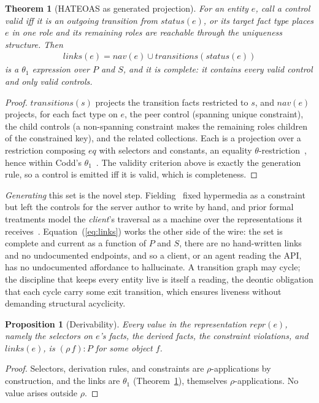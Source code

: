 \documentclass[10pt,twocolumn]{article}
\theoremstyle{plain}
\newtheorem{theorem}{Theorem}
\newtheorem{proposition}{Proposition}
\theoremstyle{definition}
\begin{document}
\begin{theorem}[HATEOAS as generated projection]\label{thm:hateoas}
For an entity $e$, call a control \emph{valid} iff it is an outgoing transition from $\mathit{status}(e)$, or its target fact type places $e$ in one role and its remaining roles are reachable through the uniqueness structure. Then
\begin{align}
\mathit{links}(e)=\mathit{nav}(e)\cup\mathit{transitions}(\mathit{status}(e)) \label{eq:links}
\end{align}
is a $\theta_1$ expression over $P$ and $S$, and it is \emph{complete}: it contains every valid control and only valid controls.
\end{theorem}
\begin{proof}
$\mathit{transitions}(s)$ projects the transition facts restricted to $s$, and $\mathit{nav}(e)$ projects, for each fact type on $e$, the peer control (spanning unique constraint), the child controls (a non-spanning constraint makes the remaining roles children of the constrained key), and the related collections. Each is a projection over a restriction composing $\mathit{eq}$ with selectors and constants, an equality $\theta$-restriction~\cite[Sec.\,2.3.5]{codd72}, hence within Codd's $\theta_1$~\cite[Sec.\,2.2]{codd70}. The validity criterion above is exactly the generation rule, so a control is emitted iff it is valid, which is completeness.
\end{proof}

\noindent \emph{Generating} this set is the novel step. Fielding~\cite{fielding00} fixed hypermedia as a constraint but left the controls for the server author to write by hand, and prior formal treatments model the \emph{client}'s traversal as a machine over the representations it receives~\cite{zuzak11}. Equation~(\ref{eq:links}) works the other side of the wire: the set is complete and current as a function of $P$ and $S$, there are no hand-written links and no undocumented endpoints, and so a client, or an agent reading the API, has no undocumented affordance to hallucinate. A transition graph may cycle; the discipline that keeps every entity live is itself a reading, the deontic obligation that each cycle carry some exit transition, which ensures liveness without demanding structural acyclicity.

\begin{proposition}[Derivability]\label{prop:derive}
Every value in the representation $\mathit{repr}(e)$, namely the selectors on $e$'s facts, the derived facts, the constraint violations, and $\mathit{links}(e)$, is $(\rho\,f)\!:\!P$ for some object $f$.
\end{proposition}
\begin{proof}
Selectors, derivation rules, and constraints are $\rho$-applications by construction, and the links are $\theta_1$ (Theorem~\ref{thm:hateoas}), themselves $\rho$-applications. No value arises outside $\rho$.
\end{proof}
\end{document}
